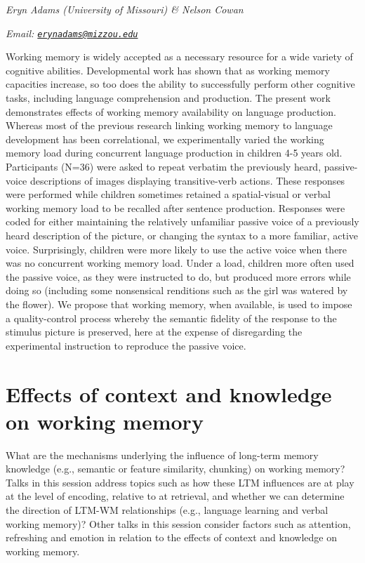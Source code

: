\documentclass[
  12pt,
]{book}
\begin{document}
\emph{Eryn Adams (University of Missouri) \& Nelson Cowan}

\emph{Email: \href{mailto:erynadams@mizzou.edu}{\nolinkurl{erynadams@mizzou.edu}}}

Working memory is widely accepted as a necessary resource for a wide variety of cognitive abilities. Developmental work has shown that as working memory capacities increase, so too does the ability to successfully perform other cognitive tasks, including language comprehension and production. The present work demonstrates effects of working memory availability on language production. Whereas most of the previous research linking working memory to language development has been correlational, we experimentally varied the working memory load during concurrent language production in children 4-5 years old. Participants (N=36) were asked to repeat verbatim the previously heard, passive-voice descriptions of images displaying transitive-verb actions. These responses were performed while children sometimes retained a spatial-visual or verbal working memory load to be recalled after sentence production. Responses were coded for either maintaining the relatively unfamiliar passive voice of a previously heard description of the picture, or changing the syntax to a more familiar, active voice. Surprisingly, children were more likely to use the active voice when there was no concurrent working memory load. Under a load, children more often used the passive voice, as they were instructed to do, but produced more errors while doing so (including some nonsensical renditions such as the girl was watered by the flower). We propose that working memory, when available, is used to impose a quality-control process whereby the semantic fidelity of the response to the stimulus picture is preserved, here at the expense of disregarding the experimental instruction to reproduce the passive voice.

\hypertarget{effects-of-context-and-knowledge-on-working-memory}{%
\chapter{Effects of context and knowledge on working memory}\label{effects-of-context-and-knowledge-on-working-memory}}

What are the mechanisms underlying the influence of long-term memory knowledge (e.g., semantic or feature similarity, chunking) on working memory? Talks in this session address topics such as how these LTM influences are at play at the level of encoding, relative to at retrieval, and whether we can determine the direction of LTM-WM relationships (e.g., language learning and verbal working memory)? Other talks in this session consider factors such as attention, refreshing and emotion in relation to the effects of context and knowledge on working memory.
\end{document}
